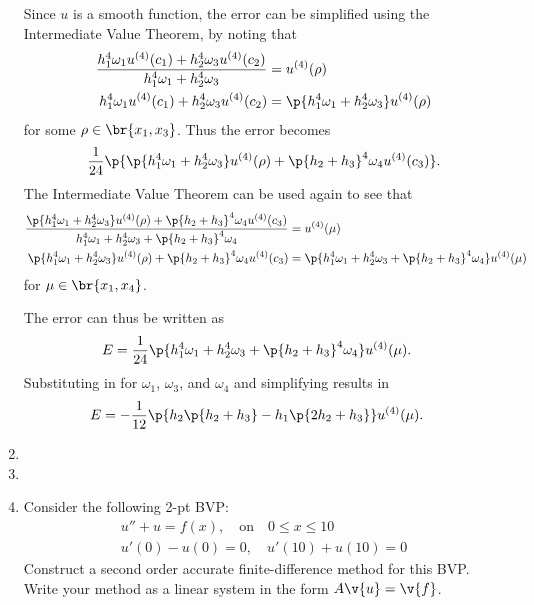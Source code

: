 \documentclass[11pt, oneside]{article}
\begin{document}
\begin{enumerate}
        Since $u$ is a smooth function, the error can be simplified using the
        Intermediate Value Theorem, by noting that
        \begin{align*}
            \frac{h_1^4 \omega_1 u^{(4)}(c_1) + h_2^4 \omega_3 u^{(4)}(c_2)}{h_1^4 \omega_1 + h_2^4 \omega_3} &= u^{(4)}(\rho) \\
            h_1^4 \omega_1 u^{(4)}(c_1) + h_2^4 \omega_3 u^{(4)}(c_2) &= \p{h_1^4 \omega_1 + h_2^4 \omega_3} u^{(4)}(\rho)
        \end{align*}
        for some $\rho \in \br{x_1, x_3}$.
        Thus the error becomes
        \begin{align*}
            \frac{1}{24}\p{\p{h_1^4 \omega_1 + h_2^4 \omega_3}u^{(4)}(\rho)+ \p{h_2 + h_3}^4 \omega_4 u^{(4)}(c_3)}.
        \end{align*}
        The Intermediate Value Theorem can be used again to see that 
        \begin{align*}
            \frac{\p{h_1^4 \omega_1 + h_2^4 \omega_3}u^{(4)}(\rho)+ \p{h_2 + h_3}^4 \omega_4 u^{(4)}(c_3)}{h_1^4 \omega_1 + h_2^4 \omega_3 + \p{h_2 + h_3}^4 \omega_4} &= u^{(4)}(\mu) \\
            \p{h_1^4 \omega_1 + h_2^4 \omega_3}u^{(4)}(\rho)+ \p{h_2 + h_3}^4 \omega_4 u^{(4)}(c_3) &= \p{h_1^4 \omega_1 + h_2^4 \omega_3 + \p{h_2 + h_3}^4 \omega_4} u^{(4)}(\mu)
        \end{align*}
        for $\mu \in \br{x_1, x_4}$.

        The error can thus be written as
        \begin{align*}
            E &= \frac{1}{24}\p{h_1^4 \omega_1 + h_2^4 \omega_3 + \p{h_2 + h_3}^4 \omega_4} u^{(4)}(\mu).
        \end{align*}
        Substituting in for $\omega_1$, $\omega_3$, and $\omega_4$ and
        simplifying results in
        \begin{align*}
            E &= -\frac{1}{12} \p{h_2\p{h_2 + h_3} - h_1 \p{2 h_2 + h_3}} u^{(4)}(\mu).
        \end{align*}

    \item %
    \item %

    \item %
        Consider the following 2-pt BVP: 
        \begin{align*}
            u'' + u = f(x), \quad \text{on} \quad 0 \le x \le 10 \\
            u'(0) - u(0) = 0, \quad u'(10) + u(10) = 0
        \end{align*}
        Construct a second order accurate finite-difference method for this BVP.
        Write your method as a linear system in the form $A \v{u} = \v{f}$.


\end{enumerate}
\end{document}
